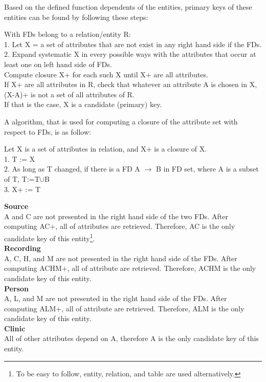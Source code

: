 Based on the defined function dependents of the entities, primary keys of these entities can be found by following these steps\cite{INF3100_Recipe_book}:
\begin{adjustwidth}{1cm}{}
With FDs belong to a relation/entity R:\\
1. Let X = a set of attributes that are not exist in any right hand side if the FDs.\\
2. Expand systematic X in every possible ways with the attributes that occur at least one on left hand side of FDs.\\
Compute closure X+ for each such X until X+ are all attributes.\\
If X+ are all attributes in R, check that whatever an attribute A is chosen in X, (X-A)+ is not a set of all attributes of R.\\
If that is the case, X is a candidate (primary) key.
\end{adjustwidth}
A algorithm, that is used for computing a closure of the attribute set with respect to FDs, is as follow\cite{INF3100_Recipe_book}:
\begin{adjustwidth}{1cm}{}
Let X is a set of attributes in relation, and X+ is a closure of X.\\
1. T := X\\
2. As long as T changed, if there is a FD A $\rightarrow$ B in FD set, where A is a subset of T, T:=T$\cup$B\\
3. X+ := T
\end{adjustwidth}
\textbf{Source}\\
A and C are not presented in the right hand side of the two FDs. After computing AC+, all of attributes are retrieved.
Therefore, AC is the only candidate key of this entity\footnote{To be easy to follow, entity, relation, and table are used alternatively.}.\\
\textbf{Recording}\\
A, C, H, and M are not presented in the right hand side of the FDs. After computing ACHM+, all of attribute are retrieved. Therefore, ACHM is the only candidate key of this entity.\\
\textbf{Person}\\
A, L, and M are not presented in the right hand side of the FDs. After computing ALM+, all of attribute are retrieved. Therefore, ALM is the only candidate key of this entity.\\
\textbf{Clinic}\\
All of other attributes depend on A, therefore A is the only candidate key of this entity.\\
